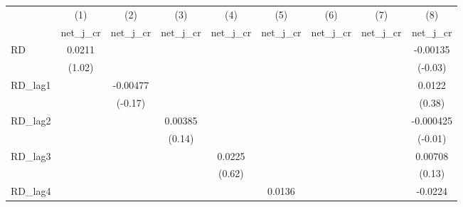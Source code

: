 {
\def\sym#1{\ifmmode^{#1}\else\(^{#1}\)\fi}
\begin{tabular}{l*{8}{c}}
\toprule
            &\multicolumn{1}{c}{(1)}&\multicolumn{1}{c}{(2)}&\multicolumn{1}{c}{(3)}&\multicolumn{1}{c}{(4)}&\multicolumn{1}{c}{(5)}&\multicolumn{1}{c}{(6)}&\multicolumn{1}{c}{(7)}&\multicolumn{1}{c}{(8)}\\
            &\multicolumn{1}{c}{net\_j\_cr}&\multicolumn{1}{c}{net\_j\_cr}&\multicolumn{1}{c}{net\_j\_cr}&\multicolumn{1}{c}{net\_j\_cr}&\multicolumn{1}{c}{net\_j\_cr}&\multicolumn{1}{c}{net\_j\_cr}&\multicolumn{1}{c}{net\_j\_cr}&\multicolumn{1}{c}{net\_j\_cr}\\
\midrule
RD          &      0.0211         &                     &                     &                     &                     &                     &                     &    -0.00135         \\
            &      (1.02)         &                     &                     &                     &                     &                     &                     &     (-0.03)         \\
\addlinespace
RD\_lag1     &                     &    -0.00477         &                     &                     &                     &                     &                     &      0.0122         \\
            &                     &     (-0.17)         &                     &                     &                     &                     &                     &      (0.38)         \\
\addlinespace
RD\_lag2     &                     &                     &     0.00385         &                     &                     &                     &                     &   -0.000425         \\
            &                     &                     &      (0.14)         &                     &                     &                     &                     &     (-0.01)         \\
\addlinespace
RD\_lag3     &                     &                     &                     &      0.0225         &                     &                     &                     &     0.00708         \\
            &                     &                     &                     &      (0.62)         &                     &                     &                     &      (0.13)         \\
\addlinespace
RD\_lag4     &                     &                     &                     &                     &      0.0136         &                     &                     &     -0.0224         \\

\end{tabular}}
